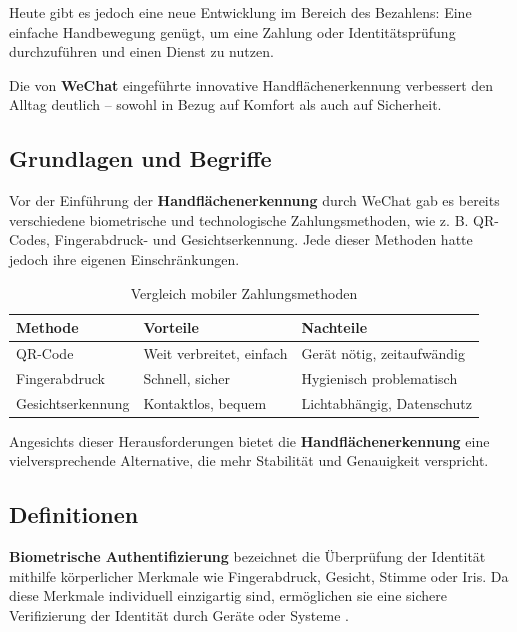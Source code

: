 \documentclass[paper=a4,fontsize=12pt,ngerman]{scrartcl}
\begin{document}
Heute gibt es jedoch eine neue Entwicklung im Bereich des Bezahlens: Eine 
einfache Handbewegung genügt, um eine Zahlung oder Identitätsprüfung 
durchzuführen und einen Dienst zu nutzen.

Die von \textbf{WeChat} eingeführte innovative Handflächenerkennung verbessert den 
Alltag deutlich – sowohl in Bezug auf Komfort als auch auf Sicherheit.


\subsection{Grundlagen und Begriffe}

Vor der Einführung der \textbf{Handflächenerkennung} durch WeChat gab es bereits 
verschiedene biometrische und technologische Zahlungsmethoden, wie z. B. QR-Codes, 
Fingerabdruck- und Gesichtserkennung. Jede dieser Methoden hatte jedoch ihre eigenen 
Einschränkungen.

\begin{table}[h]
\centering
\begin{tabular}{|l|p{5cm}|p{5cm}|}
\hline
\textbf{Methode} & \textbf{Vorteile} & \textbf{Nachteile} \\ 
\hline
QR-Code & Weit verbreitet, einfach & Gerät nötig, zeitaufwändig \\
\hline
Fingerabdruck & Schnell, sicher & Hygienisch problematisch \\
\hline
Gesichtserkennung & Kontaktlos, bequem & Lichtabhängig, Datenschutz \\
\hline
\end{tabular}
\caption{Vergleich mobiler Zahlungsmethoden}
\label{tab:zahlungsmethoden}
\end{table}

Angesichts dieser Herausforderungen bietet die \textbf{Handflächenerkennung} eine 
vielversprechende Alternative, die mehr Stabilität und Genauigkeit verspricht\cite{tang2022wechat}. 

\vspace*{1.5cm}

\subsection{Definitionen}
\textbf{Biometrische Authentifizierung} bezeichnet die Überprüfung der Identität mithilfe 
körperlicher Merkmale wie Fingerabdruck, Gesicht, Stimme oder Iris. Da diese Merkmale 
individuell einzigartig sind, ermöglichen sie eine sichere Verifizierung der Identität 
durch Geräte oder Systeme \cite{geeksforgeeks2025palm}.
\end{document}
